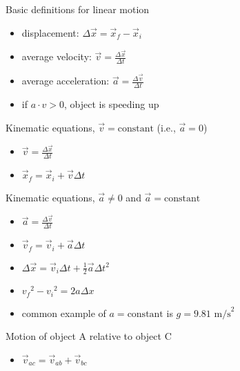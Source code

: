 \documentclass[11pt,letterpaper]{article}
\begin{document}
\noindent Basic definitions for linear motion
\begin{itemize}
\item displacement: $\Delta{\vec{x}}=\vec{x}_f-\vec{x}_i$
\item average velocity: $\vec{v}=\displaystyle\frac{\Delta{\vec{x}}}{\Delta{t}}$
\item average acceleration: $\vec{a}=\displaystyle\frac{\Delta{\vec{v}}}{\Delta{t}}$
\item if $a\cdot v > 0$, object is speeding up
\end{itemize}
\noindent Kinematic equations, $\vec{v}=\mbox{constant}$ (i.e., $\vec{a}=0$)
\begin{itemize}
\item $\vec{v}=\displaystyle\frac{\Delta{\vec{x}}}{\Delta{t}}$
\item $\vec{x}_f=\vec{x}_i+\vec{v}\Delta{t}$
\end{itemize}
\noindent Kinematic equations, $\vec{a}\neq{0}$ and $\vec{a}=\mbox{constant}$
\begin{itemize}
\item $\vec{a}=\displaystyle\frac{\Delta{\vec{v}}}{\Delta{t}}$
\item $\vec{v}_f=\vec{v}_i+\vec{a}\Delta{t}$
\item $\Delta{\vec{x}}=\vec{v}_i\Delta{t}+\displaystyle\frac{1}{2}\vec{a}\Delta{t}^2$
\item ${v_f}^2-{v_i}^2=2a\Delta{x}$
\item common example of $a=\mbox{constant}$ is $g=9.81\mbox{ m/s}^2$
\end{itemize}
\noindent Motion of object A relative to object C
\begin{itemize}
\item $\vec{v}_{ac}=\vec{v}_{ab}+\vec{v}_{bc}$
\end{itemize}
\end{document}
